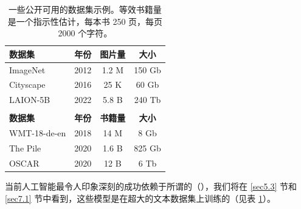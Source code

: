 \begin{table}[h]
	\centering
	\begin{tabular}{lccc}  
		\textbf{数据集} & \textbf{年份} & \textbf{图片量} & \textbf{大小} \\
        \hline
		ImageNet       & 2012          & 1.2 M          & 150 Gb \\
		Cityscape      & 2016          & 25 K           & 60 Gb  \\
		LAION-5B       & 2022          & 5.8 B          & 240 Tb \\
        \\
		\textbf{数据集} & \textbf{年份} & \textbf{书籍量} & \textbf{大小} \\
        \hline
		WMT-18-de-en   & 2018          & 14 M          & 8 Gb    \\
		The Pile       & 2020          & 1.6 B         & 825 Gb  \\
		OSCAR          & 2020          & 12 B          & 6 Tb 
	\end{tabular}
    \caption{一些公开可用的数据集示例。等效书籍量是一个指示性估计，每本书 250 页，每页 2000 个字符。}
	\label{table3.1}
\end{table}

当前人工智能最令人印象深刻的成功依赖于所谓的（），我们将在 \ref{sec5.3} 节和 \ref{sec7.1} 节中看到，这些模型是在超大的文本数据集上训练的（见表 \ref{table3.1}）。




